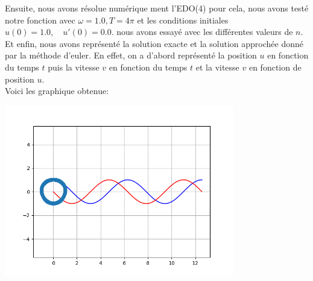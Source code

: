 \documentclass{article}
\begin{document}
Ensuite, nous avons résolue numérique ment l'EDO(4) pour cela, nous avons testé notre fonction avec $\omega = 1.0, T = 4\pi$ et les conditions initiales $u(0) = 1.0, \quad u'(0) = 0.0$. nous avons essayé avec les différentes valeurs de $n$.\\

Et enfin, nous avons représenté la solution exacte et la solution approchée donné par la méthode d'euler. En effet, on a d'abord représenté la position $u$ en fonction du temps $t$ puis la vitesse $v$ en fonction du temps $t$ et la vitesse $v$ en fonction de position $u$. \\

Voici les graphique obtenue:

\includegraphics[width=10cm]{5.png}
\end{document}
